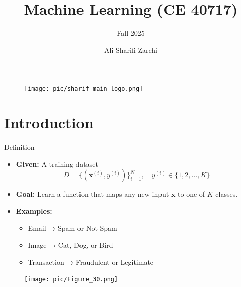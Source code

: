 \documentclass[serif, aspectratio=169]{beamer}
\author{Ali Sharifi-Zarchi}
\title{Machine Learning (CE 40717)}
\subtitle{Fall 2025}
\institute{
    CE Department \\
    Sharif University of Technology
}
\begin{document}
\begin{frame}
    \titlepage
    \vspace*{-0.6cm}
    \begin{figure}[htpb]
        \begin{center}
            \texttt{[image: pic/sharif-main-logo.png]}
        \end{center}
    \end{figure}
\end{frame}

\begin{frame}
\tableofcontents[sectionstyle=show,
subsectionstyle=show/shaded/hide,
subsubsectionstyle=show/shaded/hide]
\end{frame}

\section{Introduction}

\begin{frame}{Definition}
    \begin{minipage}{0.55\textwidth}
        \begin{itemize}\itemsep1em
            \item \textbf{Given:} A training dataset
            \[
                D = \{(\mathbf{x}^{(i)}, y^{(i)})\}_{i=1}^{N}, \quad 
                y^{(i)} \in \{1, 2, \dots, K\}
            \]
            \item \textbf{Goal:} Learn a function that maps any new input $\mathbf{x}$ to one of $K$ classes.
            \item \textbf{Examples:}
            \begin{itemize}
                \item Email → Spam or Not Spam
                \item Image → Cat, Dog, or Bird
                \item Transaction → Fraudulent or Legitimate
            \end{itemize}
        \end{itemize}
    \end{minipage}
    \hfill
    \begin{minipage}{0.42\textwidth}
        \begin{figure}
            \centering
            \texttt{[image: pic/Figure\_30.png]}
        \end{figure}
    \end{minipage}
\end{frame}
\end{document}
